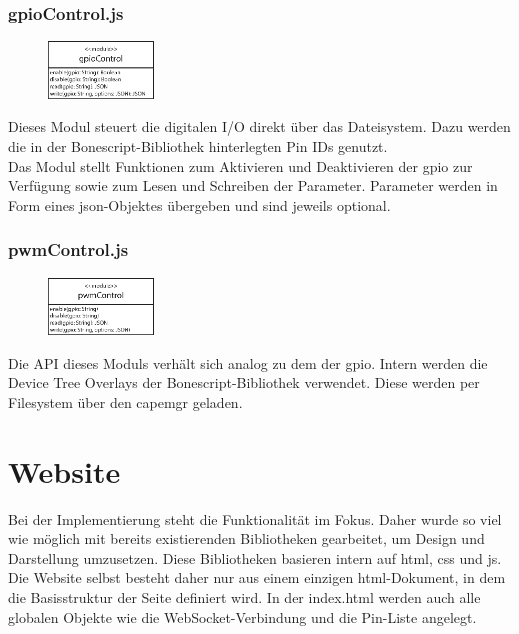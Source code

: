 \subsubsection{gpioControl.js}
\begin{figure}
\vspace{-14pt}
\centering
\includegraphics[width = 0.25\textwidth]{documentation/images/apiGPIOControl.eps}
\end{figure}

Dieses Modul steuert die digitalen I/O direkt über das Dateisystem. Dazu werden die in der Bonescript-Bibliothek hinterlegten Pin IDs genutzt.\\

Das Modul stellt Funktionen zum Aktivieren und Deaktivieren der \gls{gpio} zur Verfügung sowie zum Lesen und Schreiben der Parameter. Parameter werden in Form eines \gls{json}-Objektes übergeben und sind jeweils optional.

\subsubsection{pwmControl.js}
\begin{figure}
\vspace{-14pt}
\centering
\includegraphics[width = 0.25\textwidth]{documentation/images/apiPWMControl.eps}
\end{figure}

Die API dieses Moduls verhält sich analog zu dem der \gls{gpio}. Intern werden die Device Tree Overlays der Bonescript-Bibliothek verwendet. Diese werden per Filesystem über den \gls{capemgr} geladen.

\section{Website} Bei der Implementierung steht die Funktionalität im Fokus. Daher wurde so viel wie möglich mit bereits existierenden Bibliotheken gearbeitet, um Design und Darstellung umzusetzen. Diese Bibliotheken basieren intern auf \gls{html}, \gls{css} und \gls{js}.\\
Die Website selbst besteht daher nur aus einem einzigen \gls{html}-Dokument, in dem die Basisstruktur der Seite definiert wird. In der index.html werden auch alle globalen Objekte wie die WebSocket-Verbindung und die Pin-Liste angelegt.\\

